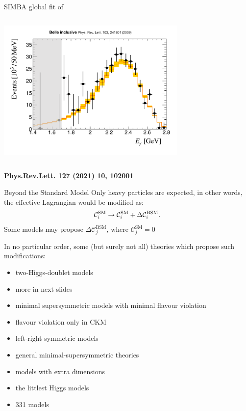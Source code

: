 \documentclass[xcolor=dvipsnames]{beamer}
\begin{document}
\begin{frame}{SIMBA global fit of \BtoXsgamma}
\begin{columns}
         \includegraphics[width=0.7\textwidth]{figures/belle_spec_default_la055_a3.pdf}
      \end{columns}
      \begin{flushright}
         {\tiny\textbf{Phys.Rev.Lett. 127 (2021) 10, 102001}}
      \end{flushright}
   \end{frame}

\begin{frame}{Beyond the Standard Model}
   \scriptsize
   Only heavy particles are expected, in other words, the effective Lagrangian would be modified as:
   \begin{equation}\nonumber
      \mathcal{C}_i^{\mathrm{SM}} \rightarrow \mathcal{C}_i^{\mathrm{SM}} + \Delta\mathcal{C}_i^{\mathrm{BSM}}.
   \end{equation}
   Some models may propose $\Delta\mathcal{C}_j^{\mathrm{BSM}}$, where $\mathcal{C}_j^{\mathrm{SM}}=0$

\vspace{10pt}
   In no particular order, some (but surely not all) theories which propose such modifications:
   \begin{itemize}
      \item two-Higgs-doublet models 
      \item[\ra] more in next slides
      \item minimal supersymmetric models with minimal flavour violation
      \item[\ra] flavour violation only in CKM
      \item left-right symmetric models
      \item general minimal-supersymmetric theories
      \item models with extra dimensions
      \item the littlest Higgs models
      \item 331 models
   \end{itemize}
\end{frame}
\end{document}
